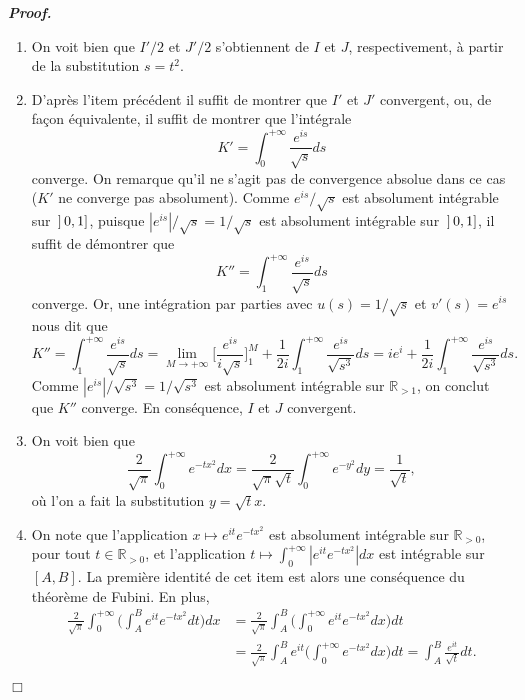 \documentclass[11pt,a4paper]{article}
\newcommand{\RR}{\mathbb{R}}
\newenvironment{preuve}[1][]
{\vskip 2mm  \noindent\emph{\bf Proof#1. }}{$\Box$ \vskip 2mm}
\begin{document}
		\begin{preuve}
			\begin{enumerate}
				\item On voit bien que $I'/2$ et $J'/2$ s'obtiennent de $I$ et $J$, respectivement, à partir de la substitution $s = t^{2}$. 
				
				\item D'après l'item précédent il suffit de montrer que $I'$ et $J'$ convergent, ou, de façon équivalente, 
				il suffit de montrer que l'intégrale
				\[      K' = \int_0^{+\infty}\frac{e^{is}}{\sqrt{s}}ds     \]
				converge. 
				On remarque qu'il ne s'agit pas de convergence absolue dans ce cas ($K'$ ne converge pas absolument). 
				Comme $e^{is}/\sqrt{s}$ est absolument intégrable sur $ \hskip 0.6mm ] \hskip 0.6mm 0,1]$, puisque 
				$|e^{is}|/\sqrt{s} = 1/ \sqrt{s}$ est absolument intégrable sur $ \hskip 0.6mm ] \hskip 0.6mm 0,1]$, il suffit de démontrer que 
				\[      K'' = \int_{1}^{+\infty}\frac{e^{is}}{\sqrt{s}}ds     \]
				converge. 
				Or, une intégration par parties avec $u(s) = 1/\sqrt{s}$ et $v'(s) = e^{is}$ nous dit que 
				\[      K'' = \int_{1}^{+\infty}\frac{e^{is}}{\sqrt{s}}ds = \underset{M \rightarrow + \infty}{\lim}  \bigg[ \frac{e^{is}}{i \sqrt{s}} \bigg]_{1}^{M} + \frac{1}{2i} \int_{1}^{+\infty}\frac{e^{is}}{\sqrt{s^{3}}}ds = i e^{i} + \frac{1}{2i} \int_{1}^{+\infty}\frac{e^{is}}{\sqrt{s^{3}}}ds.      \]
				Comme $|e^{is}|/\sqrt{s^{3}} = 1/ \sqrt{s^{3}}$ est absolument intégrable sur $\RR_{>1}$, on conclut que $K''$ converge. 
				En conséquence, $I$ et $J$ convergent. 
				
				\item On voit bien que 
				\[     \frac{2}{\sqrt{\pi}}\int_0^{+\infty}e^{-tx^2}dx = \frac{2}{\sqrt{\pi}\sqrt{t}}\int_0^{+\infty}e^{-y^2}dy = \frac{1}{\sqrt{t}},     \]
				où l'on a fait la substitution $y = \sqrt{t} x$. 
				
				\item On note que l'application $x \mapsto e^{it}e^{-tx^2}$ est absolument intégrable sur $\RR_{> 0}$, pour tout $t \in \RR_{>0}$, 
				et l'application $t \mapsto \int_{0}^{+\infty} |e^{it}e^{-tx^2}| dx$ est intégrable sur $[A,B]$. 
				La première identité de cet item est alors une conséquence du théorème de Fubini. 
				En plus, 
				\begin{align*}
				\frac{2}{\sqrt{\pi}}\int_0^{+\infty}\bigg(\int_A^B e^{it}e^{-tx^2} dt\bigg)dx &= \frac{2}{\sqrt{\pi}} \int_A^B\bigg(\int_0^{+\infty}e^{it}e^{-tx^2}dx\bigg)dt 
				\\
				&= \frac{2}{\sqrt{\pi}} \int_A^B e^{it} \bigg(\int_0^{+\infty}e^{-tx^2}dx\bigg)dt = \int_A^B\frac{e^{it}}{\sqrt{t}}dt.     
				\end{align*} 
				

\end{enumerate}
\end{preuve}
\end{document}
